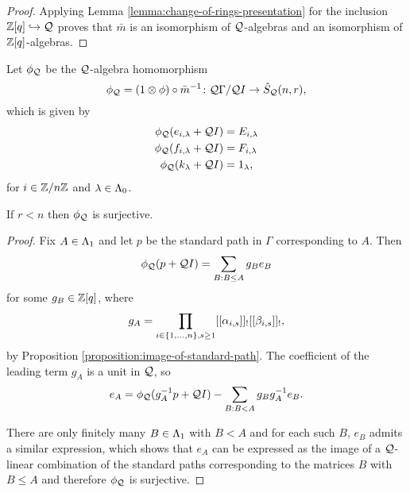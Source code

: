 \documentclass[a4paper, 11pt, twoside]{report}
\begin{document}
\begin{proof}
Applying Lemma \ref{lemma:change-of-rings-presentation} for the inclusion $\mathbb{Z}[q]\hookrightarrow\mathcal{Q}$ proves that $\bar{m}$ is an isomorphism of $\mathcal{Q}$-algebras and an isomorphism of $\mathbb{Z}[q]$-algebras.
\end{proof}

Let $\phi_{\mathcal{Q}}$ be the $\mathcal{Q}$-algebra homomorphism
\begin{equation*}
\phi_{\mathcal{Q}}=(1\otimes \phi)\circ \bar{m}^{-1}\colon \mathcal{Q}\Gamma/{\mathcal{Q} I}\to\hat{S}_{\mathcal{Q}}(n,r),
\end{equation*}
which is given by
\begin{align*}
\phi_{\mathcal{Q}}(e_{i,\lambda} +\mathcal{Q}I) &= E_{i,\lambda}\\
\phi_{\mathcal{Q}}(f_{i,\lambda} +\mathcal{Q}I) &= F_{i,\lambda}\\
\phi_{\mathcal{Q}}(k_\lambda +\mathcal{Q}I) &= 1_\lambda,
\end{align*}
for $i\in\mathbb{Z}/{n \mathbb{Z}}$ and $\lambda\in\Lambda_0{}$.

\begin{proposition}\label{proposition:q-schur-presentation}
If $r<n$ then $\phi_{\mathcal{Q}}$ is surjective.
\end{proposition}

\begin{proof}
Fix $A\in\Lambda_1{}$ and let $p$ be the standard path in $\Gamma$ corresponding to $A$. Then
\begin{equation*}
\phi_{\mathcal{Q}}(p+\mathcal{Q} I) = \sum_{B:B\le A} g_Be_B
\end{equation*}
for some $g_B\in\mathbb{Z}[q]$, where
\begin{equation*}
g_A = \prod_{i\in\{1,\ldots,n\},s\geq 1}[[\alpha_{i,s}]]_![[\beta_{i,s}]]_!,
\end{equation*}
by Proposition \ref{proposition:image-of-standard-path}. The coefficient of the leading term $g_A$ is a unit in $\mathcal{Q}$, so
\begin{equation*}
e_A = \phi_{\mathcal{Q}}(g_A^{-1}p+\mathcal{Q} I) - \sum_{B:B<A} g_Bg_A^{-1} e_B.
\end{equation*}

There are only finitely many $B\in\Lambda_1{}$ with $B<A$ and for each such $B$, $e_B$ admits a similar expression, which shows that $e_A$ can be expressed as the image of a $\mathcal{Q}$-linear combination of the standard paths corresponding to the matrices $B$ with $B\le A$ and therefore $\phi_{\mathcal{Q}}$ is surjective.
\end{proof}
\end{document}
